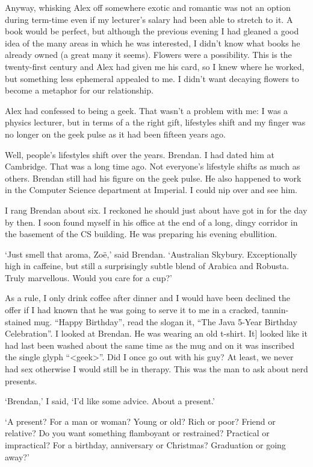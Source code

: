 Anyway, whisking Alex off somewhere exotic and romantic was not an
option during term-time even if my lecturer's salary had been able
to stretch to it. A book would be perfect, but although the previous
evening I had gleaned a good idea of the many areas in which he was
interested, I didn't know what books he already owned (a great many
it seems). Flowers were a possibility. This is the twenty-first
century and Alex had given me his card, so I knew where he worked,
but something less ephemeral appealed to me. I didn't want decaying
flowers to become a metaphor for our relationship.

Alex had confessed to being a geek. That wasn't a problem with me: I
was a physics lecturer, but in terms of a the right gift, lifestyles
shift and my finger was no longer on the geek pulse as it had been
fifteen years ago.

Well, people's lifestyles shift over the years. Brendan. I had dated
him at Cambridge. That was a long time ago. Not everyone's lifestyle
shifts as much as others. Brendan still had his figure on the geek
pulse. He also happened to work in the Computer Science department at Imperial. I
could nip over and see him.

I rang Brendan about six. I reckoned he should just about have got
in for the day by then. I soon found myself in his office at the end
of a long, dingy corridor in the basement of the CS building. He was
preparing his evening ebullition.

`Just smell that aroma, Zoë,' said Brendan. `Australian Skybury.
Exceptionally high in caffeine, but still a surprisingly subtle
blend of Arabica and Robusta. Truly marvellous. Would you care for a
cup?'

As a rule, I only drink coffee after dinner and I would have been
declined the offer if I had known that he was going to serve it to
me in a cracked, tannin-stained mug. ``Happy Birthday'', read the
slogan it, ``The Java 5-Year Birthday Celebration''. I looked at
Brendan. He was wearing an old t-shirt. It] looked like it had last
been washed about the same time as the mug and on it was inscribed
the single glyph ``<geek>''. Did I once go out with his guy? At least, we
never had sex otherwise I would still be in therapy. This was the
man to ask about nerd presents.

`Brendan,' I said, `I'd like some advice. About a present.'

`A present? For a man or woman? Young or old? Rich or poor? Friend
or relative? Do you want something flamboyant or restrained?
Practical or impractical? For a birthday, anniversary or Christmas?
Graduation or going away?'

